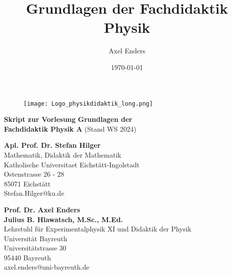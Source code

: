 \documentclass[11pt,a4paper]{book}
\title{Grundlagen der Fachdidaktik Physik}
\author{Axel Enders}
\date{\today}
\begin{document}
\begin{titlepage}
	\vs{0.5cm}
	\begin{figure}[h]
	\centering
	\texttt{[image: Logo\_physikdidaktik\_long.png]}
	\label{fig:Logo}
	\end{figure}
	
	\vs{1cm}
	\begin{center}
	\Large \textbf{Skript zur Vorlesung}
	\bip\bip
	\Huge \textbf{Grundlagen der \\ Fachdidaktik  Physik A}
	\bip\bip
	\Large
	(Stand WS 2024)
	\end{center}

	\vs{6cm}

	\begin{flushright}
		\textbf{Apl. Prof. Dr. Stefan Hilger} \\
			Mathematik, Didaktik der Mathematik  \\
			Katholische Universitaet Eichst\"att-Ingolstadt \\
			Ostenstrasse 26 - 28  \\
			85071 Eichst\"att \\
			Stefan.Hilger@ku.de \\

	\vs{0.5cm}

		\textbf{Prof. Dr. Axel Enders} \\
		\textbf{Julius B. Hlawatsch, M.Sc., M.Ed.}\\
		Lehrstuhl f\"ur Experimentalphysik XI und Didaktik der Physik  \\
		Universit\"at Bayreuth  \\
		Universit\"atstrasse 30  \\
		95440 Bayreuth  \\
		axel.enders@uni-bayreuth.de
	\end{flushright}

\end{titlepage}

\newpage
\end{document}

